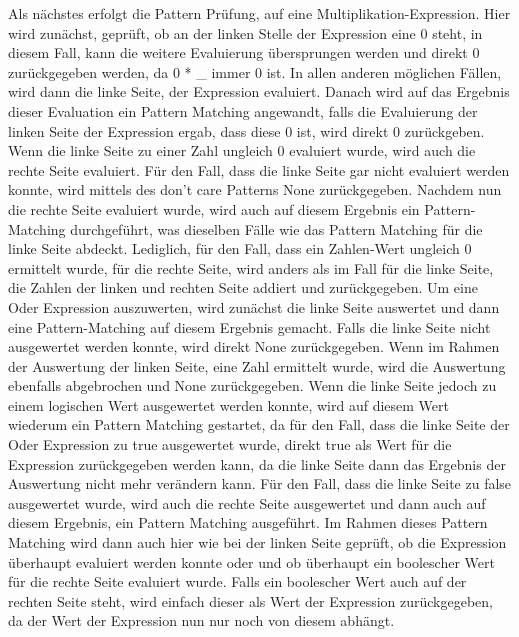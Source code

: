\documentclass[a4paper, 1ppt]{article}
\begin{document}
Als nächstes erfolgt die Pattern Prüfung, auf eine Multiplikation-Expression. Hier wird zunächst, geprüft, ob an der linken Stelle der Expression eine 0 steht, in diesem Fall, kann die weitere Evaluierung übersprungen werden und direkt 0 zurückgegeben werden, da 0 * \_ immer 0 ist. In allen anderen möglichen Fällen, wird dann die linke Seite, der Expression evaluiert. Danach wird auf das Ergebnis dieser Evaluation ein Pattern Matching angewandt, falls die Evaluierung der linken Seite der Expression ergab, dass diese 0 ist, wird direkt 0 zurückgeben. Wenn die linke Seite zu einer Zahl ungleich 0 evaluiert wurde, wird auch die rechte Seite evaluiert. Für den Fall, dass die linke Seite gar nicht evaluiert werden konnte, wird mittels des don't care Patterns None zurückgegeben. Nachdem nun die rechte Seite evaluiert wurde, wird auch auf diesem Ergebnis ein Pattern-Matching durchgeführt, was dieselben Fälle wie das Pattern Matching für die linke Seite abdeckt. Lediglich, für den Fall, dass ein Zahlen-Wert ungleich 0 ermittelt wurde, für die rechte Seite, wird anders als im Fall für die linke Seite, die Zahlen der linken und rechten Seite addiert und zurückgegeben.
Um eine Oder Expression auszuwerten, wird zunächst die linke Seite auswertet und dann eine Pattern-Matching auf diesem Ergebnis gemacht. Falls die linke Seite nicht ausgewertet werden konnte, wird direkt None zurückgegeben. Wenn im Rahmen der Auswertung der linken Seite, eine Zahl ermittelt wurde, wird die Auswertung ebenfalls abgebrochen und None zurückgegeben. Wenn die linke Seite jedoch zu einem logischen Wert ausgewertet werden konnte, wird auf diesem Wert wiederum ein Pattern Matching gestartet, da für den Fall, dass die linke Seite der Oder Expression zu true ausgewertet wurde, direkt true als Wert für die Expression zurückgegeben werden kann, da die linke Seite dann das Ergebnis der Auswertung nicht mehr verändern kann. Für den Fall, dass die linke Seite zu false ausgewertet wurde, wird auch die rechte Seite ausgewertet und dann auch auf diesem Ergebnis, ein Pattern Matching ausgeführt.
Im Rahmen dieses Pattern Matching wird dann auch hier wie bei der linken Seite geprüft, ob die Expression überhaupt evaluiert werden konnte oder und ob überhaupt ein boolescher Wert für die rechte Seite evaluiert wurde. Falls ein boolescher Wert auch auf der rechten Seite steht, wird einfach dieser als Wert der Expression zurückgegeben, da der Wert der Expression nun nur noch von diesem abhängt.
\end{document}
